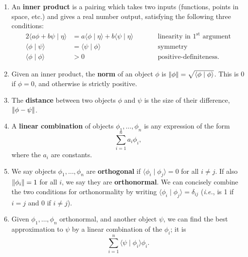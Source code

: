 \documentclass{article}
\newcommand{\norm}[1]{\left|\kern-1pt\left|#1\right|\kern-1pt\right|}
\begin{document}
\begin{enumerate}
	\item An \textbf{inner product} is a pairing which takes two inputs (functions, points in space, etc.) and gives a real number output, satisfying the following three conditions:
		\begin{alignat*}{2}
			\langle a\phi+b\psi\mid \eta\rangle &= a\langle \phi\mid \eta \rangle + b\langle \psi\mid \eta\rangle\qquad&& \mbox{linearity in $1^\mathrm{st}$ argument}\\
			\langle \phi\mid \psi\rangle &= \langle \psi\mid \phi\rangle\qquad&& \mbox{symmetry}\\
			\langle \phi\mid\phi\rangle &> 0\qquad&& \mbox{positive-definiteness.}
		\end{alignat*}
	\item Given an inner product, the \textbf{norm} of an object $\phi$ is $\norm{\phi}=\sqrt{\langle\phi\mid\phi\rangle}$. This is 0 if $\phi=0$, and otherwise is strictly positive.
	\item The \textbf{distance} between two objects $\phi$ and $\psi$ is the size of their difference, $\norm{\phi-\psi}$.
	\item A \textbf{linear combination} of objects $\phi_1,\hdots,\phi_n$ is any expression of the form
		\[\sum_{i=1}^n a_i\phi_i,\]
		where the $a_i$ are constants.
	\item We say objects $\phi_1,\hdots,\phi_n$ are \textbf{orthogonal} if $\langle\phi_i\mid\phi_j\rangle=0$ for all $i\neq j$. If also $\norm{\phi_i}=1$ for all $i$, we say they are \textbf{orthonormal}. We can concisely combine the two conditions for orthonormality by writing $\langle\phi_i\mid\phi_j\rangle=\delta_{ij}$ (\textit{i.e.}, is 1 if $i=j$ and 0 if $i\neq j$).
	\item Given $\phi_1,\hdots,\phi_n$ orthonormal, and another object $\psi$, we can find the best approximation to $\psi$ by a linear combination of the $\phi_i$; it is
		\[\sum_{i=1}^n \langle \psi\mid\phi_i\rangle\phi_i.\]
\end{enumerate}
\end{document}
